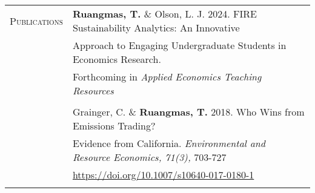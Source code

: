 \documentclass[letterpaper,11pt,oneside]{article}\usepackage[]{graphicx}\usepackage[]{xcolor}
\newcommand{\link}[1]{{\color{blue}\href{#1}{#1}}}
\begin{document}
\noindent \begin{tabular}{p{1.2in} l}
\textsc{Publications}   & \textbf{Ruangmas, T.} \& Olson, L. J. 2024. FIRE Sustainability Analytics: An Innovative \\
				                & Approach to Engaging Undergraduate Students in Economics Research. \\
				                & Forthcoming in \textit{Applied Economics Teaching Resources} \\
	                      & \\  
                        & Grainger, C. \& \textbf{Ruangmas, T.} 2018. Who Wins from Emissions Trading? \\
				                & Evidence from California. \textit{Environmental and Resource Economics, 71(3),} 703-727 \\
				                & \link{https://doi.org/10.1007/s10640-017-0180-1} \\
				                & \\   
				

\end{tabular}
\end{document}

